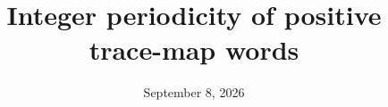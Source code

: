 \documentclass[11pt]{article}
\title{Integer periodicity of positive trace-map words}
\author{}
\date{September 8, 2026}
\begin{document}
\maketitle
\begin{abstract}

\end{abstract}










\end{document}
